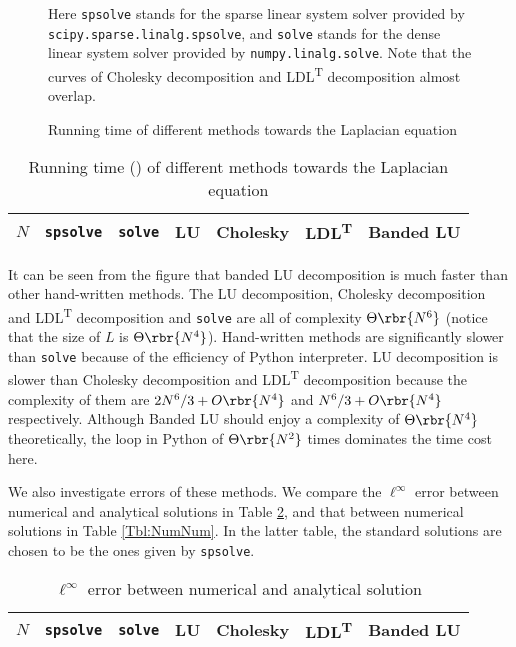 \documentclass[english, nochinese]{pnote}
\begin{document}
\begin{figure}[htb]
{
\centering

\caption{Running time of different methods towards the Laplacian equation}
\label{Fig:Time}
}
{
\small
Here \verb"spsolve" stands for the sparse linear system solver provided by \verb"scipy.sparse.linalg.spsolve", and \verb"solve" stands for the dense linear system solver provided by \verb"numpy.linalg.solve". Note that the curves of Cholesky decomposition and LDL\textsuperscript{T} decomposition almost overlap.
}
\end{figure}
\begin{table}[htb]
\centering
\small
\begin{tabular}{|c|c|c|c|c|c|c|}
\hline
$N$ & \verb"spsolve" & \verb"solve" & LU & Cholesky & LDL\textsuperscript{T} & Banded LU \\
\hline

\end{tabular}
\caption{Running time () of different methods towards the Laplacian equation}
\label{Tbl:RunTime}
\end{table}

It can be seen from the figure that banded LU decomposition is much faster than other hand-written methods. The LU decomposition, Cholesky decomposition and LDL\textsuperscript{T} decomposition and \verb"solve" are all of complexity $ \Theta \rbr{N^6} $ (notice that the size of $L$ is $ \Theta \rbr{N^4} $). Hand-written methods are significantly slower than \verb"solve" because of the efficiency of Python interpreter. LU decomposition is slower than Cholesky decomposition and LDL\textsuperscript{T} decomposition because the complexity of them are $ 2 N^6 / 3 + O \rbr{N^4} $ and $ N^6 / 3 + O \rbr{N^4} $ respectively. Although Banded LU should enjoy a complexity of $ \Theta \rbr{N^4} $ theoretically, the loop in Python of $ \Theta \rbr{N^2} $ times dominates the time cost here.

We also investigate errors of these methods. We compare the $\ell^{\infty}$ error between numerical and analytical solutions in Table \ref{Tbl:NumAna}, and that between numerical solutions in Table \ref{Tbl:NumNum}. In the latter table, the standard solutions are chosen to be the ones given by \verb"spsolve".

\begin{table}[htb]
\centering
\small
\begin{tabular}{|c|c|c|c|c|c|c|}
\hline
$N$ & \verb"spsolve" & \verb"solve" & LU & Cholesky & LDL\textsuperscript{T} & Banded LU \\
\hline

\end{tabular}
\caption{$\ell^{\infty}$ error between numerical and analytical solution}
\label{Tbl:NumAna}
\end{table}
\end{document}
